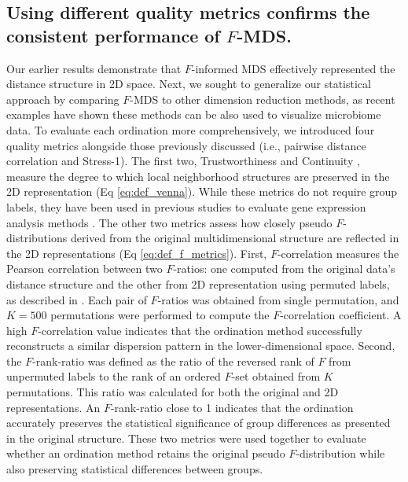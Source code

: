 \documentclass[10pt,letterpaper]{article}
\newcommand{\1}{{\rm 1}\kern-0.24em{\rm I}}
\begin{document}
\subsection*{Using different quality metrics confirms the consistent performance of $F$-MDS.}
Our earlier results demonstrate that $F$-informed MDS effectively represented the distance structure in 2D space. Next, we sought to generalize our statistical approach by comparing $F$-MDS to other dimension reduction methods, as recent examples have shown these methods can be also used to visualize microbiome data. To evaluate each ordination more comprehensively, we introduced four quality metrics alongside those previously discussed (i.e., pairwise distance correlation and Stress-1). The first two, Trustworthiness and Continuity \cite{Venna01}, measure the degree to which local neighborhood structures are preserved in the 2D representation (Eq \ref{eq:def_venna}). While these metrics do not require group labels, they have been used in previous studies to evaluate gene expression analysis methods \cite{Nikkila02, Kaski03}. The other two metrics assess how closely pseudo $F$-distributions derived from the original multidimensional structure are reflected in the 2D representations (Eq \ref{eq:def_f_metrics}). First, $F$-correlation measures the Pearson correlation between two $F$-ratios: one computed from the original data's distance structure and the other from 2D representation using permuted labels, as described in \cite{Serviss17}. Each pair of $F$-ratios was obtained from single permutation, and $K=500$ permutations were performed to compute the $F$-correlation coefficient. A high $F$-correlation value indicates that the ordination method successfully reconstructs a similar dispersion pattern in the lower-dimensional space. Second, the $F$-rank-ratio was defined as the ratio of the reversed rank of $F$ from unpermuted labels to the rank of an ordered $F$-set obtained from $K$ permutations. This ratio was calculated for both the original and 2D representations. An $F$-rank-ratio close to 1 indicates that the ordination accurately preserves the statistical significance of group differences as presented in the original structure. These two metrics were used together to evaluate whether an ordination method retains the original pseudo $F$-distribution while also preserving statistical differences between groups.
\end{document}
